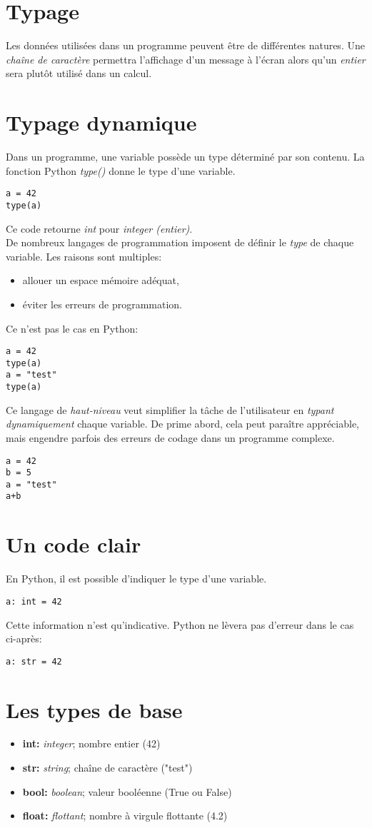 \documentclass[a4paper,11pt]{article}
\begin{document}
\begin{Form}
\section{Typage}
Les données utilisées dans un programme peuvent être de différentes natures. Une \emph{chaîne de caractère} permettra l'affichage d'un message à l'écran alors qu'un \emph{entier} sera plutôt utilisé dans un calcul.
\section{Typage dynamique}
Dans un programme, une variable possède un type déterminé par son contenu. La fonction Python \emph{type()} donne le type d'une variable.
\begin{lstlisting}
a = 42
type(a)
\end{lstlisting}
Ce code retourne \emph{int} pour \emph{integer (entier)}.\\
De nombreux langages de programmation imposent de définir le \emph{type} de chaque variable. Les raisons sont multiples:
\begin{itemize}
\item allouer un espace mémoire adéquat,
\item éviter les erreurs de programmation.
\end{itemize}
Ce n'est pas le cas en Python:
\begin{lstlisting}
a = 42
type(a)
a = "test"
type(a)
\end{lstlisting}
Ce langage de \emph{haut-niveau} veut simplifier la tâche de l'utilisateur en \emph{typant dynamiquement} chaque variable. De prime abord, cela peut paraître appréciable, mais engendre parfois des erreurs de codage dans un programme complexe.
\begin{lstlisting}
a = 42
b = 5
a = "test"
a+b
\end{lstlisting}
\section{Un code clair}
En Python, il est possible d'indiquer le type d'une variable.
\begin{lstlisting}
a: int = 42
\end{lstlisting}
Cette information n'est qu'indicative. Python ne lèvera pas d'erreur dans le cas ci-après:
\begin{lstlisting}
a: str = 42
\end{lstlisting}
\section{Les types de base}
\begin{itemize}
\item \textbf{int:} \emph{integer}; nombre entier (42)
\item \textbf{str:} \emph{string}; chaîne de caractère ("test")
\item \textbf{bool:} \emph{boolean}; valeur booléenne (True ou False)
\item \textbf{float:} \emph{flottant}; nombre à virgule flottante (4.2)
\end{itemize}

\end{Form}
\end{document}
